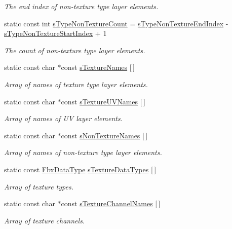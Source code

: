 \begin{DoxyCompactItemize}
\begin{DoxyCompactList}\small\item\em The end index of non-\/texture type layer elements. \end{DoxyCompactList}\item 
static const int \hyperlink{class_fbx_layer_element_a97147949d75646270ceee636624c0bba}{s\+Type\+Non\+Texture\+Count} = \hyperlink{class_fbx_layer_element_a5f1b9591af5822bec240657d21261b43}{s\+Type\+Non\+Texture\+End\+Index} -\/ \hyperlink{class_fbx_layer_element_a13fe30eb6e884901f5ce503f095c716e}{s\+Type\+Non\+Texture\+Start\+Index} + 1
\begin{DoxyCompactList}\small\item\em The count of non-\/texture type layer elements. \end{DoxyCompactList}\item 
static const char $\ast$const \hyperlink{class_fbx_layer_element_a70bc77c1478a82df7baa7bba04babc87}{s\+Texture\+Names} \mbox{[}$\,$\mbox{]}
\begin{DoxyCompactList}\small\item\em Array of names of texture type layer elements. \end{DoxyCompactList}\item 
static const char $\ast$const \hyperlink{class_fbx_layer_element_aa397609e5ddc5c1a603cfcc65ff34552}{s\+Texture\+U\+V\+Names} \mbox{[}$\,$\mbox{]}
\begin{DoxyCompactList}\small\item\em Array of names of UV layer elements. \end{DoxyCompactList}\item 
static const char $\ast$const \hyperlink{class_fbx_layer_element_a787e39c12e1718d35f9c0168eeee1091}{s\+Non\+Texture\+Names} \mbox{[}$\,$\mbox{]}
\begin{DoxyCompactList}\small\item\em Array of names of non-\/texture type layer elements. \end{DoxyCompactList}\item 
static const \hyperlink{class_fbx_data_type}{Fbx\+Data\+Type} \hyperlink{class_fbx_layer_element_a8fd9e526f65ca7e33947c9fba6a7e0d0}{s\+Texture\+Data\+Types} \mbox{[}$\,$\mbox{]}
\begin{DoxyCompactList}\small\item\em Array of texture types. \end{DoxyCompactList}\item 
static const char $\ast$const \hyperlink{class_fbx_layer_element_abebd9e62e1c7b06e471cf00173904aec}{s\+Texture\+Channel\+Names} \mbox{[}$\,$\mbox{]}
\begin{DoxyCompactList}\small\item\em Array of texture channels. \end{DoxyCompactList}\end{DoxyCompactItemize}
